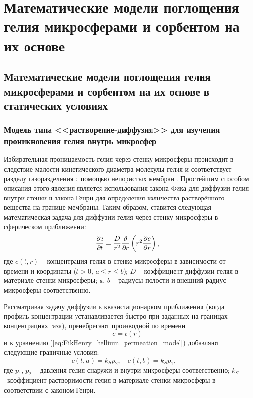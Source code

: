 \chapter{Математические модели поглощения гелия микросферами и сорбентом на их основе}
\section{Математические модели поглощения гелия микросферами и сорбентом на их основе в статических условиях}
\subsection{Модель типа <<растворение-диффузия>> для изучения проникновения гелия внутрь микросфер}

Избирательная проницаемость гелия через стенку микросферы происходит в следствие малости кинетического диаметра молекулы гелия и соответствует разделу газоразделения с помощью непористых мембран \cite{Mulder}. Простейшим способом описания этого явления является использования закона Фика для диффузии гелия внутри стенки и закона Генри для определения количества растворённого вещества на границе мембраны. Таким образом, ставится следующая математическая задача для диффузии гелия через стенку микросферы в сферическом приближении:
\begin{equation}
\label{eq:FikHenry_hellium_permeation_model}
\frac{\partial c}{\partial t}=\frac{D}{r^2}\frac{\partial }{\partial r}\left( r^2 \frac{\partial c}{\partial r} \right),
\end{equation}
где $c(t,r)$ -- концентрация гелия в стенке микросферы в зависимости от времени и координаты ($t > 0$, $a \leq r \leq b$); $D$ -- коэффициент диффузии гелия в материале стенки микросферы; $a$, $b$ -- радиусы полости и внешний радиус микросферы соответственно. 

Рассматривая задачу диффузии в квазистационарном приближении (когда профиль концентрации устанавливается быстро при заданных на границах концентрациях газа), пренебрегают производной по времени 
\begin{equation}
\label{eq:FikHenry_hellium_permeation_model_quasistat}
c = c(r)
\end{equation}
и к уравнению (\ref{eq:FikHenry_hellium_permeation_model}) добавляют следующие граничные условия:
\begin{equation}
\label{eq:FikHenry_hellium_permeation_model_conditions}
c(t, a)  = k_S p_2,\quad
c(t, b)  = k_S p_1,\quad
\end{equation}
где $p_1$, $p_2$ -- давления гелия снаружи и внутри микросферы соответственно; $k_S$~--~коэффициент растворимости гелия в материале стенки микросферы в соответствии с законом Генри.

